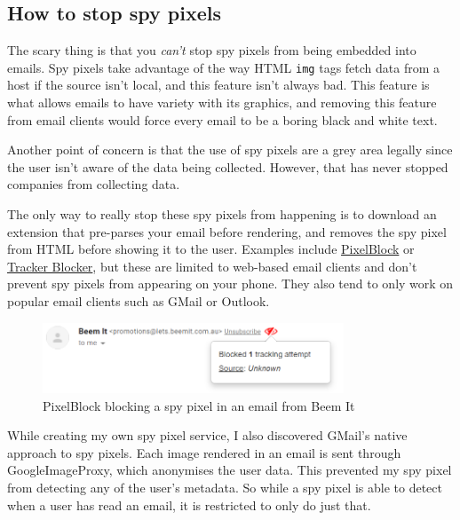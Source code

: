 \documentclass{article}
\begin{document}
\subsection{How to stop spy pixels}

The scary thing is that you \emph{can't} stop spy pixels from being embedded into emails. Spy pixels take advantage of the way HTML \texttt{img} tags fetch data from a host if the source isn't local, and this feature isn't always bad. This feature is what allows emails to have variety with its graphics, and removing this feature from email clients would force every email to be a boring black and white text.

Another point of concern is that the use of spy pixels are a grey area legally since the user isn't aware of the data being collected. However, that has never stopped companies from collecting data.

The only way to really stop these spy pixels from happening is to download an extension that pre-parses your email before rendering, and removes the spy pixel from HTML before showing it to the user. Examples include \href{https://chrome.google.com/webstore/detail/pixelblock/jmpmfcjnflbcoidlgapblgpgbilinlem?hl=en}{PixelBlock} or \href{https://chrome.google.com/webstore/detail/tracker-blocker-stop-trac/okacfeiojkgmcaonaikblpicellplcdn?hl=en}{Tracker Blocker}, but these are limited to web-based email clients and don't prevent spy pixels from appearing on your phone. They also tend to only work on popular email clients such as GMail or Outlook.

\begin{figure}[H]
\centering
\includegraphics[width=0.8\textwidth]{images/beem.png}
\caption{\label{beem}PixelBlock blocking a spy pixel in an email from Beem It}
\end{figure}

While creating my own spy pixel service, I also discovered GMail's native approach to spy pixels. Each image rendered in an email is sent through GoogleImageProxy, which anonymises the user data. This prevented my spy pixel from detecting any of the user's metadata. So while a spy pixel is able to detect when a user has read an email, it is restricted to only do just that.
\end{document}
